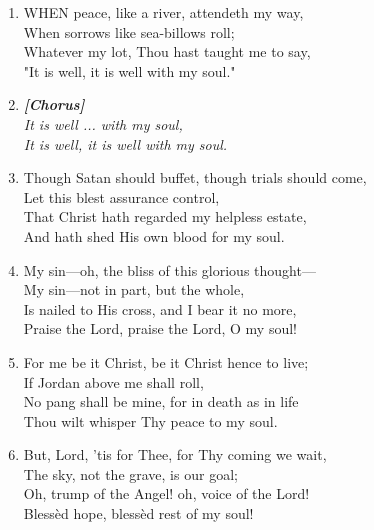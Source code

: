 \begin{enumerate}
    \item WHEN peace, like a river, attendeth my way, \\
        When sorrows like sea-billows roll; \\
        Whatever my lot, Thou hast taught me to say, \\
        "It is well, it is well with my soul."

    \item[] \vspace{0.4em}
    \textbf{\textit{[Chorus]}} \\
    \textit{It is well ... with my soul,} \\
    \textit{It is well, it is well with my soul.}
    \vspace{0.4em}

    \item Though Satan should buffet, though trials should come, \\
        Let this blest assurance control, \\
        That Christ hath regarded my helpless estate, \\
        And hath shed His own blood for my soul.

    \item My sin---oh, the bliss of this glorious thought--- \\
        My sin---not in part, but the whole, \\
        Is nailed to His cross, and I bear it no more, \\
        Praise the Lord, praise the Lord, O my soul!

    \item For me be it Christ, be it Christ hence to live; \\
        If Jordan above me shall roll, \\
        No pang shall be mine, for in death as in life \\
        Thou wilt whisper Thy peace to my soul.

    \item But, Lord, 'tis for Thee, for Thy coming we wait, \\
        The sky, not the grave, is our goal; \\
        Oh, trump of the Angel! oh, voice of the Lord! \\
        Bless\`ed hope, bless\`ed rest of my soul!

\end{enumerate}

